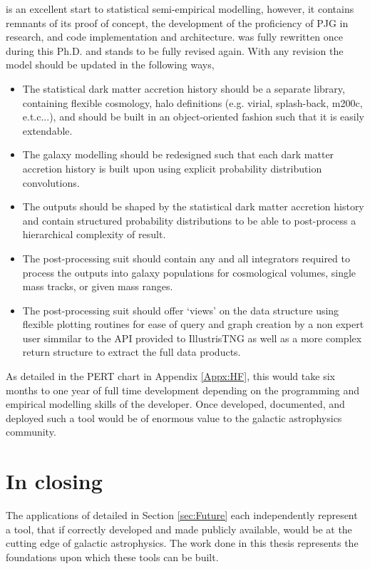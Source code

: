 \steel is an excellent start to statistical semi-empirical modelling, however, it contains remnants of its proof of concept, the development of the proficiency of PJG in research, and code implementation and architecture. \steel was fully rewritten once during this Ph.D. and stands to be fully revised again. With any revision the model should be updated in the following ways,

\begin{itemize}
    \item The statistical dark matter accretion history should be a separate library, containing flexible cosmology, halo definitions (e.g. virial, splash-back, m200c, e.t.c...), and should be built in an object-oriented fashion such that it is easily extendable.
    \item The galaxy modelling should be redesigned such that each dark matter accretion history is built upon using explicit probability distribution convolutions.
    \item The outputs should be shaped by the statistical dark matter accretion history and contain structured probability distributions to be able to post-process a hierarchical complexity of result.
    \item The post-processing suit should contain any and all integrators required to process the outputs into galaxy populations for cosmological volumes, single mass tracks, or given mass ranges.
    \item The post-processing suit should offer `views' on the data structure using flexible plotting routines for ease of query and graph creation by a non expert user simmilar to the API provided to IllustrisTNG \cite[][https://www.tng-project.org/data/vis/]{Nelson2019TheRelease} as well as a more complex return structure to extract the full data products.
\end{itemize}

As detailed in the PERT chart in Appendix \ref{Appx:HF}, this would take six months to one year of full time development depending on the programming and empirical modelling skills of the developer. Once developed, documented, and deployed such a tool would be of enormous value to the galactic astrophysics community. 

\section{In closing}

The applications of \steel detailed in Section \ref{sec:Future} each independently represent a tool, that if correctly developed and made publicly available, would be at the cutting edge of galactic astrophysics. The work done in this thesis represents the foundations upon which these tools can be built. 

